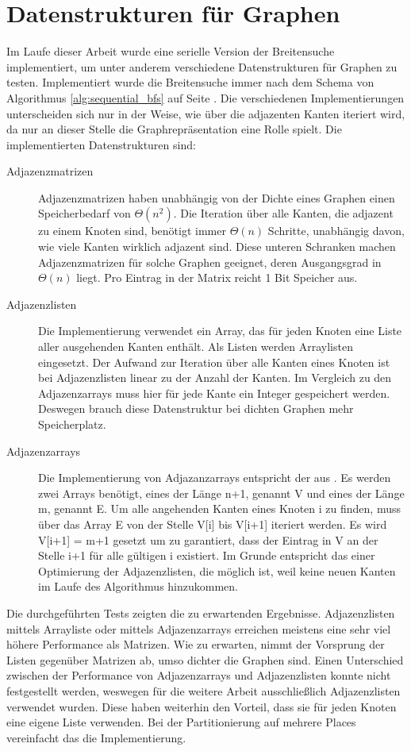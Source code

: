 \section{Datenstrukturen für Graphen} %
\label{sec:datenstrukturen_f_r_graphen}
Im Laufe dieser Arbeit wurde eine serielle Version der Breitensuche implementiert, um unter anderem verschiedene Datenstrukturen für Graphen zu testen. Implementiert wurde die Breitensuche immer nach dem Schema von Algorithmus \ref{alg:sequential_bfs} auf Seite \pageref{alg:sequential_bfs}. Die verschiedenen Implementierungen unterscheiden sich nur in der Weise, wie über die adjazenten Kanten iteriert wird, da nur an dieser Stelle die Graphrepräsentation eine Rolle spielt. Die implementierten Datenstrukturen sind:
\begin{description}
	\item [Adjazenzmatrizen] Adjazenzmatrizen haben unabhängig von der Dichte eines Graphen einen Speicherbedarf von $\Theta(n^2)$. Die Iteration über alle Kanten, die adjazent zu einem Knoten sind, benötigt immer $\Theta(n)$ Schritte, unabhängig davon, wie viele Kanten wirklich adjazent sind. Diese unteren Schranken machen Adjazenzmatrizen für solche Graphen geeignet, deren Ausgangsgrad in $\Theta(n)$ liegt. Pro Eintrag in der Matrix reicht 1 Bit Speicher aus.
	\item [Adjazenzlisten] Die Implementierung verwendet ein Array, das für jeden Knoten eine Liste aller ausgehenden Kanten enthält. Als Listen werden Arraylisten eingesetzt. Der Aufwand zur Iteration über alle Kanten eines Knoten ist bei Adjazenzlisten linear zu der Anzahl der Kanten. Im Vergleich zu den Adjazenzarrays muss hier für jede Kante ein Integer gespeichert werden. Deswegen brauch diese Datenstruktur bei dichten Graphen mehr Speicherplatz.
	\item [Adjazenzarrays] Die Implementierung von Adjazanzarrays entspricht der aus \cite{SWB-283374373}. Es werden zwei Arrays benötigt, eines der Länge n+1, genannt V und eines der Länge m, genannt E. Um alle angehenden Kanten eines Knoten i zu finden, muss über das Array E von der Stelle V[i] bis V[i+1] iteriert werden. Es wird V[i+1] = m+1 gesetzt um zu garantiert, dass der Eintrag in V an der Stelle i+1 für alle gültigen i existiert. Im Grunde entspricht das einer Optimierung der Adjazenzlisten, die möglich ist, weil keine neuen Kanten im Laufe des Algorithmus hinzukommen.
\end{description}

Die durchgeführten Tests zeigten die zu erwartenden Ergebnisse. Adjazenzlisten mittels Arrayliste oder mittels Adjazenzarrays erreichen meistens eine sehr viel höhere Performance als Matrizen. Wie zu erwarten, nimmt der Vorsprung der Listen gegenüber Matrizen ab, umso dichter die Graphen sind. Einen Unterschied zwischen der Performance von Adjazenzarrays und Adjazenzlisten konnte nicht festgestellt werden, weswegen für die weitere Arbeit ausschließlich Adjazenzlisten verwendet wurden. Diese haben weiterhin den Vorteil, dass sie für jeden Knoten eine eigene Liste verwenden. Bei der Partitionierung auf mehrere Places vereinfacht das die Implementierung.

